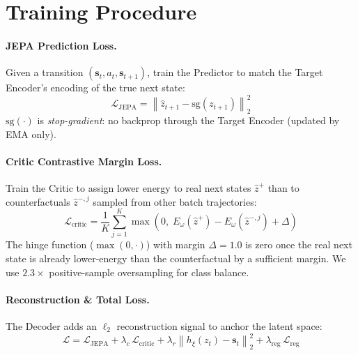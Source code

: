 \documentclass[10pt,twocolumn]{article}
\begin{document}
\section{Training Procedure}
\label{sec:training}

\paragraph{JEPA Prediction Loss.}
Given a transition $(\mathbf{s}_t, a_t, \mathbf{s}_{t+1})$, train the Predictor to match
the Target Encoder's encoding of the true next state:
\begin{equation}
\mathcal{L}_{\mathrm{JEPA}} = \left\|\hat{z}_{t+1} - \mathrm{sg}(z_{t+1})\right\|_2^2
\label{eq:jepa_loss}
\end{equation}
$\mathrm{sg}(\cdot)$ is \emph{stop-gradient}: no backprop through the Target Encoder
(updated by EMA only).

\paragraph{Critic Contrastive Margin Loss.}
Train the Critic to assign lower energy to real next states $\hat{z}^+$ than to
counterfactuals $\hat{z}^{-,j}$ sampled from other batch trajectories:
\begin{equation}
\mathcal{L}_{\mathrm{critic}} = \frac{1}{K}\sum_{j=1}^{K}
\max\!\left(0,\; E_\omega\!\left(\hat{z}^+\right) - E_\omega\!\left(\hat{z}^{-,j}\right) + \Delta\right)
\label{eq:critic_loss}
\end{equation}
The hinge function ($\max(0,\cdot)$) with margin $\Delta{=}1.0$ is zero once the real
next state is already lower-energy than the counterfactual by a sufficient margin.
We use $2.3\times$ positive-sample oversampling for class balance.

\paragraph{Reconstruction \& Total Loss.}
The Decoder adds an $\ell_2$ reconstruction signal to anchor the latent space:
\begin{equation}
\mathcal{L} = \mathcal{L}_{\mathrm{JEPA}} + \lambda_c\,\mathcal{L}_{\mathrm{critic}}
              + \lambda_r\!\left\|h_\xi(z_t) - \mathbf{s}_t\right\|_2^2
              + \lambda_{\mathrm{reg}}\,\mathcal{L}_{\mathrm{reg}}
\label{eq:total_loss}
\end{equation}
\end{document}
